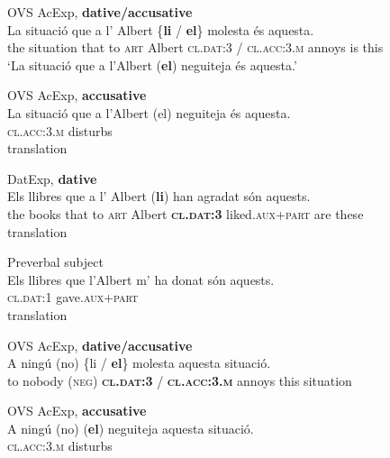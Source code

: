 \documentclass[output=paper,colorlinks,citecolor=brown,modfonts,nonflat]{langsci/langscibook}
\begin{document}
\ea%
 \label{ex:royo:10}
 \ea  OVS AcExp, \textbf{dative/accusative} \label{ex:royo:10a}\\
 \gll  La situació que a l’ Albert \{\textbf{li} / \textbf{el}\} molesta és aquesta.\\
	 the situation that to \textsc{art} Albert \textsc{cl.dat:3} / \textsc{cl.acc:3.m} annoys is this \\
 \glt `La situació que a l’Albert (\textbf{el}) neguiteja és aquesta.'
 
 \ex OVS AcExp, \textbf{accusative}\label{ex:royo:10b}\\
 \gll La  situació  que a  l’Albert (el) neguiteja és aquesta.\\
   \textsc{cl.acc}:3.\textsc{m} disturbs \\
 \glt  translation
  
 \ex  DatExp, \textbf{dative} \label{ex:royo:10c}\\
 \gll Els llibres que a l’ Albert (\textbf{li}) han agradat són aquests.\\
  the books that to \textsc{art} Albert \textbf{\textsc{cl.dat:3}} liked.\textsc{aux+part} are these\\
 \glt  translation
 
  
 
  
 \ex  Preverbal subject\label{ex:royo:10e}\\
 \gll  Els llibres que l’Albert m’ ha donat són aquests.\\
	 	 \textsc{cl.dat:1} gave.\textsc{aux+part} \\
 \glt  translation
 
 \z
 \z
 

\ea%
 \label{ex:royo:11}
 \ea OVS AcExp, \textbf{dative/accusative}\label{ex:royo:11a}\\
 \gll  A ningú (no) \{{li} / \textbf{el}\} molesta aquesta situació.\\
    to nobody (\textsc{neg}) \textbf{\textsc{cl.dat:3}} / \textbf{\textsc{cl.acc:3.m}} annoys this situation \\
\glt {}
 
 
 \ex OVS AcExp, \textbf{accusative} \label{ex:royo:11b}\\
 \gll A ningú (no) (\textbf{el}) neguiteja aquesta situació.\\
  	 \textsc{cl.acc:3.m} disturbs\\ 
\glt {}
 
\end{document}
